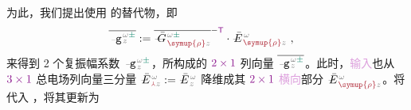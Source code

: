 为此，我们\cite{xieAnalytic3DVector}提出使用  的替代物，即
\begin{align} \label{eq:amp_vec-transverse_input}
	\overline{\Xint{\begin{smallmatrix} ~ \\ {}^{}_{\mathcolor{gray}{-}} \\ ~ \end{smallmatrix}}{09}{\mathtt{g}}^{\;\!\mathcolor{gray}{\omega} \textcolor{PineGreen}{\pm}}_{\;\! \mathcolor{gray}{z}}} &:= \overline{\Xint{\mathcolor{gray}{-}}{20}{\bar{G}}^{\;\!\mathcolor{gray}{\omega} \textcolor{PineGreen}{\pm}}_{\;\! \textcolor{Maroon}{\symup{\rho}} \mathcolor{gray}{z}}}^{-\mathsf{\textcolor{Plum}{T}}} \cdot \Xint{\mathcolor{gray}{-}}{30}{\bar{E}}^{\;\!\mathcolor{gray}{\omega}}_{\;\! \textcolor{Maroon}{\symup{\rho}} \mathcolor{gray}{z}} ~,
\end{align}
来得到 2 个\textcolor{PineGreen}{复振幅}系数 $\Xint{\begin{smallmatrix} ~ \\ {}^{}_{\mathcolor{gray}{-}} \\ ~ \end{smallmatrix}}{09}{\mathtt{g}}^{\;\!\mathcolor{gray}{\omega} \textcolor{PineGreen}{\pm}}_{\;\! \mathcolor{gray}{z}}$，所构成的 $\textcolor{Plum}{2 \times 1}$ 列向量 $\overline{\Xint{\begin{smallmatrix} ~ \\ {}^{}_{\mathcolor{gray}{-}} \\ ~ \end{smallmatrix}}{09}{\mathtt{g}}^{\;\!\mathcolor{gray}{\omega} \textcolor{PineGreen}{\pm}}_{\;\! \mathcolor{gray}{z}}}$。此时，\textcolor{Plum}{输入}也从 $\textcolor{Plum}{3 \times 1}$ \textcolor{PineGreen}{总电场列向量}三分量 $\Xint{\mathcolor{gray}{-}}{25}{\bar{E}}^{\;\!\mathcolor{gray}{\omega}}_{\;\! \textcolor{Maroon}{\Yup} \mathcolor{gray}{z}} := \Xint{\mathcolor{gray}{-}}{25}{\bar{E}}^{\;\!\mathcolor{gray}{\omega}}_{\;\! \mathcolor{gray}{z}}$ 降维成其 $\textcolor{Plum}{2 \times 1}$ \textcolor{Plum}{横向}部分 $\Xint{\mathcolor{gray}{-}}{25}{\bar{E}}^{\;\!\mathcolor{gray}{\omega}}_{\;\! \textcolor{Maroon}{\symup{\rho}} \mathcolor{gray}{z}}$。将  代入 ，将其更新为
